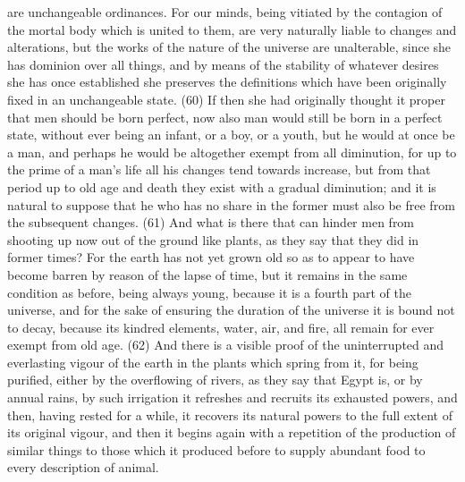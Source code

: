 are unchangeable ordinances. For our minds, being vitiated by the contagion of the mortal body
which is united to them, are very naturally liable to changes and alterations, but the works of the
nature of the universe are unalterable, since she has dominion over all things, and by means of the
stability of whatever desires she has once established she preserves the definitions which have
been originally fixed in an unchangeable state. (60) If then she had originally thought it proper that
men should be born perfect, now also man would still be born in a perfect state, without ever being
an infant, or a boy, or a youth, but he would at once be a man, and perhaps he would be altogether
exempt from all diminution, for up to the prime of a man's life all his changes tend towards
increase, but from that period up to old age and death they exist with a gradual diminution; and it is
natural to suppose that he who has no share in the former must also be free from the subsequent
changes. (61) And what is there that can hinder men from shooting up now out of the ground like
plants, as they say that they did in former times? For the earth has not yet grown old so as to
appear to have become barren by reason of the lapse of time, but it remains in the same condition
as before, being always young, because it is a fourth part of the universe, and for the sake of
ensuring the duration of the universe it is bound not to decay, because its kindred elements, water,
air, and fire, all remain for ever exempt from old age. (62) And there is a visible proof of the
uninterrupted and everlasting vigour of the earth in the plants which spring from it, for being
purified, either by the overflowing of rivers, as they say that Egypt is, or by annual rains, by such
irrigation it refreshes and recruits its exhausted powers, and then, having rested for a while, it
recovers its natural powers to the full extent of its original vigour, and then it begins again with a
repetition of the production of similar things to those which it produced before to supply abundant
food to every description of animal.

